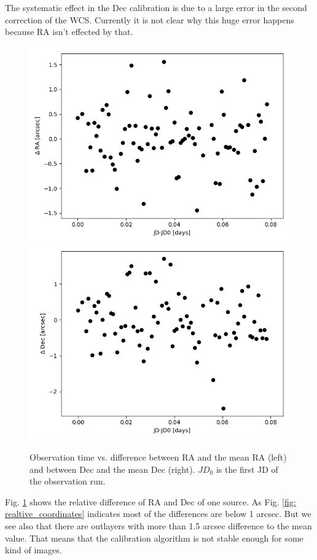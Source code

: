 The systematic effect in the Dec calibration is due to a large error in the second correction of the WCS. Currently it is not clear why this huge error happens because RA isn't effected by that.\\
\begin{figure}
	\includegraphics[width=0.475\linewidth]{./img/jd_delta_ra.png}
	\includegraphics[width=0.475\linewidth]{./img/jd_delta_dec.png}
	\caption{Observation time vs. difference between RA and the mean RA (left) and between Dec and the mean Dec (right). $JD_0$ is the first JD of the observation run.}
	\label{fig: time_delta}
\end{figure}
Fig. \ref{fig: time_delta} shows the relative difference of RA and Dec of one source. As Fig. \ref{fig: realtive_coordinates} indicates most of the differences are below 1 arcsec. But we see also that there are outlayers with more than 1.5 arcsec difference to the mean value. That means that the calibration algorithm is not stable enough for some kind of images.

